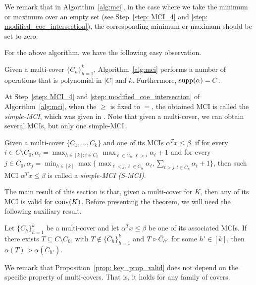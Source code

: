 

We remark that in Algorithm~\ref{alg:mci},
in the case where we take the minimum or maximum over an empty set (see Step~\ref{step: MCI_4} and \ref{step: modified_coe_intersection}), the corresponding minimum or maximum should be set to zero.

For the above algorithm, we have the following easy observation.

\begin{observation}
Given a multi-cover $\{C_h\}_{h=1}^k$, Algorithm~\ref{alg:mci} performs a number of operations that is polynomial in $|C|$ and $k$.
Furthermore, $\operatorname{supp}(\alpha) = C$.
\end{observation}

At Step~\ref{step: MCI_4} and \ref{step: modified_coe_intersection} of Algorithm~\ref{alg:mci}, when the $\geq$ is fixed to $=$, the obtained MCI is called the \emph{simple-MCI}, which was given in \cite{del2021multi}. 
Note that given a multi-cover, we can obtain several MCIs, but only one simple-MCI. 

\begin{definition}
Given a multi-cover $\{C_1, \ldots, C_k\}$ and one of its MCIs $\alpha^T x \leq \beta$, if for every $i \in C \setminus C_0, \alpha_i = \max_{h \in [k]: i \in C_h} \max_{\ell \in \bar C_h: \ell>i} \alpha_\ell + 1$ and for every $j \in C_0, \alpha_j = \min_{h \in [k]} \max \big\{ \max_{\ell<j, \ell \in \bar C_h} \alpha_\ell, \sum_{t>j, t \in \bar C_h} \alpha_t + 1 \big\}$, then such MCI $\alpha^T x \leq \beta$ is called a \emph{simple-MCI (S-MCI)}.
\end{definition}


The main result of this section is that, given a multi-cover for $K$, then any of its MCI is valid for $\operatorname{conv}(K)$. Before presenting the theorem, we will need the following auxiliary result. 


\begin{proposition}
\label{prop: key_prop_valid}
Let $\{C_h\}_{h=1}^k$ be a multi-cover and let $\alpha^T x \leq \beta$ be one of its associated MCIs. 
If there exists $T \subseteq C \setminus C_0$, with $T \notin \{\bar C_h\}_{h=1}^k$ and $T \triangleright \bar C_{h'}$ for some $h' \in [k]$, then $\alpha(T) > \alpha(\bar C_{h'})$.
\end{proposition}

 We remark that Proposition~\ref{prop: key_prop_valid} does not depend on the specific property of multi-covers.  That is, it holds for any family of covers. 


